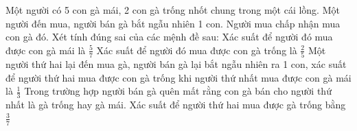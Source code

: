 \begin{ex}%
    Một người có 5 con gà mái, 2 con gà trống nhốt chung trong một cái lồng. Một người đến mua, người bán gà bắt ngẫu nhiên 1 con. Người mua chấp nhận mua con gà đó. Xét tính đúng sai của các mệnh đề sau:
    \choiceTF
    {\True Xác suất để người đó mua được con gà mái là $\frac{5}{7}$}
    { Xác suất để người đó mua được con gà trống là $\frac{2}{5}$}
    {\True Một người thứ hai lại đến mua gà, người bán gà lại bắt ngẫu nhiên ra 1 con, xác suất để người thứ hai mua được con gà trống khi người thứ nhất mua được con gà mái là $\frac{1}{3}$}
    {Trong trường hợp người bán gà quên mất rằng con gà bán cho người thứ nhất là gà trống hay gà mái. Xác suất để người thứ hai mua được gà trống bằng $\frac{3}{7}$}
\end{ex}

